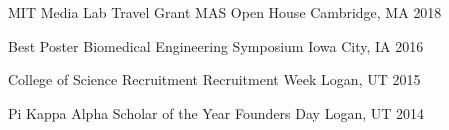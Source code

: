 

\begin{cvhonors}


\cvhonor
{MIT Media Lab Travel Grant} %
{MAS Open House} %
{Cambridge, MA} %
{2018} %


\cvhonor
{Best Poster} %
{Biomedical Engineering Symposium} %
{Iowa City, IA} %
{2016} %


\cvhonor
{College of Science Recruitment} %
{Recruitment Week} %
{Logan, UT} %
{2015} %


\cvhonor
{Pi Kappa Alpha Scholar of the Year} %
{Founders Day} %
{Logan, UT} %
{2014} %


\end{cvhonors}